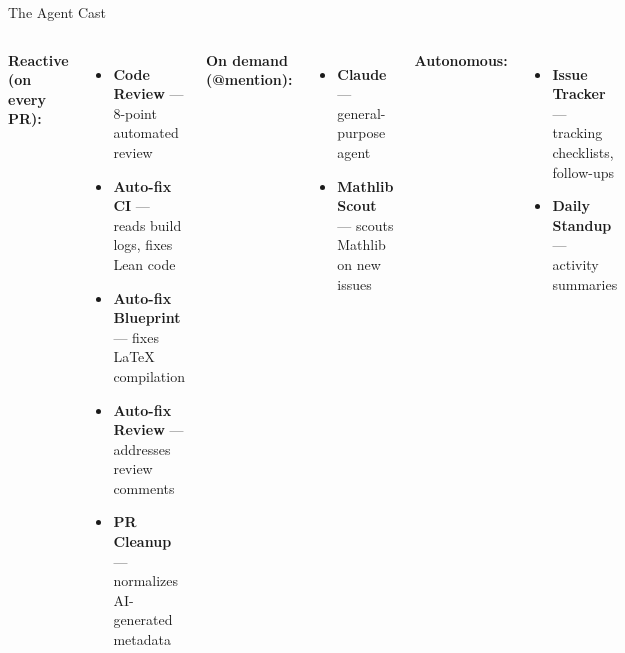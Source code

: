 \documentclass[aspectratio=169,10pt]{beamer}
\begin{document}
\begin{frame}{The Agent Cast}
    \vspace{-0.2em}
    \begin{columns}[T]
        {\footnotesize
        \textcolor{leangreen}{\textbf{Reactive (on every PR):}}
        \begin{itemize}
            \item \textcolor{leanblue}{\textbf{Code Review}} --- 8-point automated review
            \item \textcolor{amber}{\textbf{Auto-fix CI}} --- reads build logs, fixes Lean code
            \item \textcolor{amber}{\textbf{Auto-fix Blueprint}} --- fixes \LaTeX{} compilation
            \item \textcolor{amber}{\textbf{Auto-fix Review}} --- addresses review comments
            \item \textcolor{mintgreen}{\textbf{PR Cleanup}} --- normalizes AI-generated metadata
        \end{itemize}
        \textcolor{leangreen}{\textbf{On demand (@mention):}}
        \begin{itemize}
            \item \textcolor{leangreen}{\textbf{Claude}} --- general-purpose agent
            \item \textcolor{leanblue}{\textbf{Mathlib Scout}} --- scouts Mathlib on new issues
        \end{itemize}
        \textcolor{leangreen}{\textbf{Autonomous:}}
        \begin{itemize}
            \item \textcolor{deepblue}{\textbf{Issue Tracker}} --- tracking checklists, follow-ups
            \item \textcolor{dimwhite}{\textbf{Daily Standup}} --- activity summaries
        \end{itemize}
        }
        \begin{center}
\end{center}
\end{columns}
\end{frame}
\end{document}
